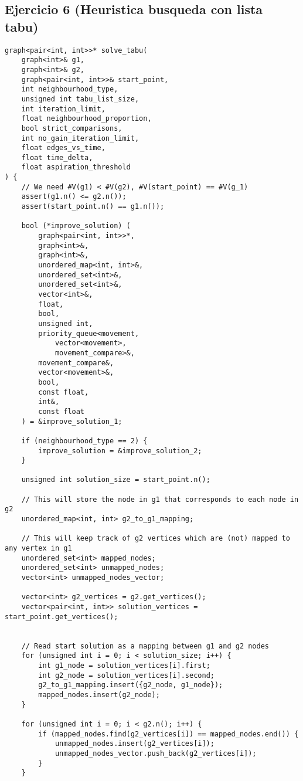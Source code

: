 \subsection{Ejercicio 6 (Heuristica busqueda con lista tabu)}
\begin{lstlisting}
graph<pair<int, int>>* solve_tabu(
    graph<int>& g1,
    graph<int>& g2,
    graph<pair<int, int>>& start_point,
    int neighbourhood_type,
    unsigned int tabu_list_size,
    int iteration_limit,
    float neighbourhood_proportion,
    bool strict_comparisons,
    int no_gain_iteration_limit,
    float edges_vs_time,
    float time_delta,
    float aspiration_threshold
) {
    // We need #V(g1) < #V(g2), #V(start_point) == #V(g_1)
    assert(g1.n() <= g2.n());
    assert(start_point.n() == g1.n());

    bool (*improve_solution) (
        graph<pair<int, int>>*,
        graph<int>&,
        graph<int>&,
        unordered_map<int, int>&,
        unordered_set<int>&,
        unordered_set<int>&,
        vector<int>&,
        float,
        bool,
        unsigned int,
        priority_queue<movement,
            vector<movement>,
            movement_compare>&,
        movement_compare&,
        vector<movement>&,
        bool,
        const float,
        int&,
        const float
    ) = &improve_solution_1;

    if (neighbourhood_type == 2) {
        improve_solution = &improve_solution_2;
    }

    unsigned int solution_size = start_point.n();

    // This will store the node in g1 that corresponds to each node in g2
    unordered_map<int, int> g2_to_g1_mapping;

    // This will keep track of g2 vertices which are (not) mapped to any vertex in g1
    unordered_set<int> mapped_nodes;
    unordered_set<int> unmapped_nodes;
    vector<int> unmapped_nodes_vector;

    vector<int> g2_vertices = g2.get_vertices();
    vector<pair<int, int>> solution_vertices = start_point.get_vertices();


    // Read start solution as a mapping between g1 and g2 nodes
    for (unsigned int i = 0; i < solution_size; i++) {
        int g1_node = solution_vertices[i].first;
        int g2_node = solution_vertices[i].second;
        g2_to_g1_mapping.insert({g2_node, g1_node});
        mapped_nodes.insert(g2_node);
    }

    for (unsigned int i = 0; i < g2.n(); i++) {
        if (mapped_nodes.find(g2_vertices[i]) == mapped_nodes.end()) {
            unmapped_nodes.insert(g2_vertices[i]);
            unmapped_nodes_vector.push_back(g2_vertices[i]);
        }
    }


\end{lstlisting}

